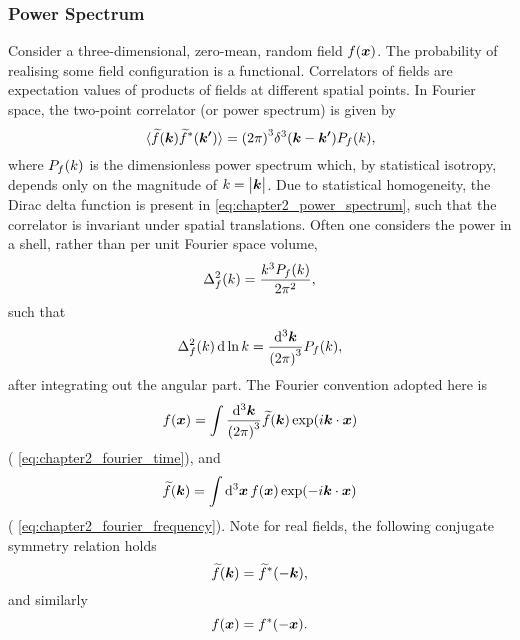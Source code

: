 \subsubsection{Power Spectrum}

Consider a three-dimensional, zero-mean, random field \(f(\vb*{x})\).
The probability of realising some field configuration is a functional.
Correlators of fields are expectation values of products of fields at different spatial points.
In Fourier space, the two-point correlator (or power spectrum) is given by
%
\begin{equation}\label{eq:chapter2_power_spectrum}
    \expval*{\widetilde{f}(\vb*{k}) \widetilde{f}^{\ast}(\vb*{k'})}
    = {(2\pi)}^{3} \delta^{3}(\vb*{k} - \vb*{k'}) P_{f}(k),
\end{equation}
%
where \(P_{f}(k)\) is the dimensionless power spectrum which, by statistical isotropy, depends only on the magnitude of \(k=\big\lvert\vb*{k}\big\rvert\).
Due to statistical homogeneity, the Dirac delta function is present in \cref{eq:chapter2_power_spectrum}, such that the correlator is invariant under spatial translations.
Often one considers the power in a shell, rather than per unit Fourier space volume, \ie{}
%
\begin{equation}\label{eq:chapter2_power_shell}
    \Delta_{f}^{2}(k)
    = \frac{k^{3}P_{f}(k)}{2\pi^{2}},
\end{equation}
%
such that
%
\begin{equation}
    \Delta_{f}^{2}(k) \dd{\ln{k}}
    = \frac{\dd[3]{\vb*{k}}}{{(2\pi)}^{3}} P_{f}(k),
\end{equation}
%
after integrating out the angular part.
The Fourier convention adopted here is
%
\begin{equation}
    f(\vb*{x})
    = \int\frac{\dd[3]{\vb*{k}}}{{(2\pi)}^{3}} \widetilde{f}(\vb*{k}) \exp(i\vb*{k}\cdot\vb*{x})
\end{equation}
%
(\cf{} \cref{eq:chapter2_fourier_time}), and
%
\begin{equation}
    \widetilde{f}(\vb*{k})
    = \int\dd[3]{\vb*{x}} f(\vb*{x}) \exp(-i\vb*{k}\cdot\vb*{x})
\end{equation}
%
(\cf{} \cref{eq:chapter2_fourier_frequency}).
Note for real fields, the following conjugate symmetry relation holds
%
\begin{equation}
    \widetilde{f}(\vb*{k})
    = \widetilde{f}^{\ast}(-\vb*{k}),
\end{equation}
%
and similarly
%
\begin{equation}
    f(\vb*{x})
    = f^{\ast}(-\vb*{x}).
\end{equation}

